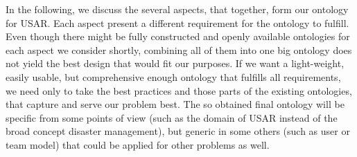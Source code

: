 In the following, we discuss the several aspects, that together, form our ontology for USAR. Each aspect present a different requirement for the ontology to fulfill. Even though there might be fully constructed and openly available ontologies for each aspect we consider shortly, combining all of them into one big ontology does not yield the best design that would fit our purposes. If we want a light-weight, easily usable, but comprehensive enough ontology that fulfills all requirements, we need only to take the best practices and those parts of the existing ontologies, that capture and serve our problem best. The so obtained final ontology will be specific from some points of view (such as the domain of USAR instead of the broad concept disaster management), but generic in some others (such as user or team model) that could be applied for other problems as well.
